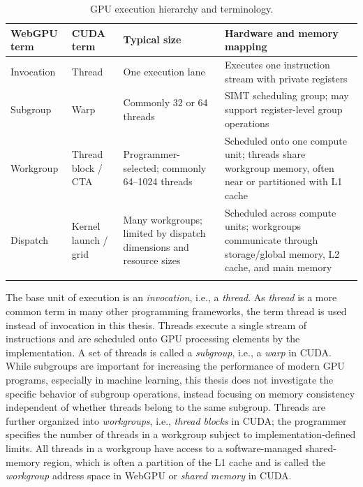 \begin{table}
   \footnotesize
   \centering
   \caption{GPU execution hierarchy and terminology.}
   \label{tab:bg-gpu-hierarchy}
   \begingroup
   \begin{tabularx}{\columnwidth}{L{2.7cm} L{2.7cm} L{3.0cm} Z}
   \toprule
   \textbf{WebGPU term} & \textbf{CUDA term} & \textbf{Typical size} & \textbf{Hardware and memory mapping} \\
   \midrule
   Invocation & Thread & One execution lane & Executes one instruction stream with private registers \\
    Subgroup & Warp & Commonly 32 or 64 threads & SIMT scheduling group; may support register-level group operations \\
   Workgroup & Thread block / CTA & Programmer-selected; commonly 64--1024 threads & Scheduled onto one compute unit; threads share workgroup memory, often near or partitioned with L1 cache \\
    Dispatch & Kernel launch / grid & Many workgroups; limited by dispatch dimensions and resource sizes & Scheduled across compute units; workgroups communicate through storage/global memory, L2 cache, and main memory \\
   \graybottomrule
   \end{tabularx}
   \endgroup
\end{table}

The base unit of execution is an \textit{invocation}, i.e., a \textit{thread}. As \textit{thread} is a more common term in many other programming frameworks, the term thread is used instead of invocation in this thesis. Threads execute a single stream of instructions and are scheduled onto GPU processing elements by the implementation. A set of threads is called a \textit{subgroup}, i.e., a \textit{warp} in CUDA. While subgroups are important for increasing the performance of modern GPU programs, especially in machine learning, this thesis does not investigate the specific behavior of subgroup operations, instead focusing on memory consistency independent of whether threads belong to the same subgroup. Threads are further organized into \textit{workgroups}, i.e., \textit{thread blocks} in CUDA; the programmer specifies the number of threads in a workgroup subject to implementation-defined limits. All threads in a workgroup have access to a software-managed shared-memory region, which is often a partition of the L1 cache and is called the \textit{workgroup} address space in WebGPU or \textit{shared memory} in CUDA.

